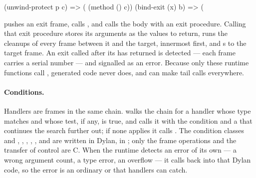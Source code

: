 \begin{dylan}
(unwind-protect p c)  =>  (%
                                                     (method () c))
(bind-exit (x) b)     =>  (%
\end{dylan}

 pushes an exit frame, calls ,
and calls the body with an exit procedure. Calling that exit procedure
stores its arguments as the values to return, runs the cleanups of every
frame between it and the target, innermost first, and s to
the target frame. An exit called after its  has returned
is detected --- each frame carries a serial number --- and signalled as
an error. Because only these runtime functions call ,
generated code never does, and can make tail calls everywhere.

\paragraph{Conditions.}
Handlers are frames in the same chain.  walks the chain
for a handler whose type matches and whose test, if any, is true, and
calls it with the condition and a  that continues the
search further out; if none applies it calls . The
condition classes and , , ,
, ,  and
 are written in Dylan, in
; only the frame operations and
the transfer of control are C. When the runtime detects an error of its
own --- a wrong argument count, a type error, an overflow --- it calls
back into that Dylan code, so the error is an ordinary
 or  that handlers can catch.

